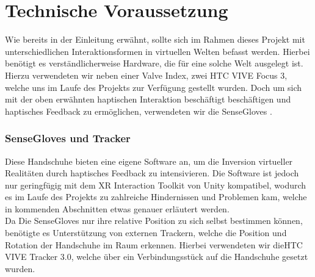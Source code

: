 
\section{Technische Voraussetzung}
Wie bereits in der Einleitung erwähnt, sollte sich im Rahmen dieses Projekt mit unterschiedlichen Interaktionsformen in virtuellen Welten befasst werden. Hierbei benötigt es verständlicherweise Hardware, die für eine solche Welt ausgelegt ist. Hierzu verwendeten wir neben einer Valve Index, zwei HTC VIVE Focus 3, welche uns im Laufe des Projekts zur Verfügung gestellt wurden. Doch um sich mit der oben erwähnten haptischen Interaktion beschäftigt beschäftigen und haptisches Feedback zu ermöglichen, verwendeten wir die \dq SenseGloves \dq. 

\subsubsection{SenseGloves und Tracker}
Diese Handschuhe bieten eine eigene Software an, um die Inversion virtueller Realitäten durch haptisches Feedback zu intensivieren. Die Software ist jedoch nur geringfügig mit dem XR Interaction Toolkit von Unity kompatibel, wodurch es im Laufe des Projekts zu zahlreiche Hindernissen und Problemen kam, welche in kommenden Abschnitten etwas genauer erläutert werden.\\ 
Da Die SenseGloves nur ihre relative Position zu sich selbst bestimmen können, benötigte es Unterstützung von externen Trackern, welche die Position und Rotation der Handschuhe im Raum erkennen. Hierbei verwendeten wir die\dq HTC VIVE Tracker 3.0\dq, welche über ein Verbindungsstück auf die Handschuhe gesetzt wurden.\\

